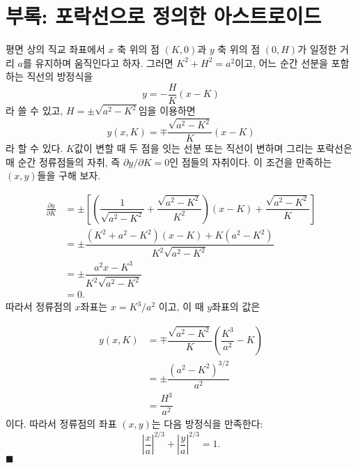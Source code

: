 \documentclass[twocolumn]{article}
\begin{document}
\appendix
\section*{부록: 포락선으로 정의한 아스트로이드}
평면 상의 직교 좌표에서 $x$ 축 위의 점  $(K, 0)$과 $y$ 축 위의 점 $(0, H)$가 일정한 거리 $a$를 유지하며 움직인다고 하자. 그러면 $K^2+H^2=a^2$이고, 어느 순간 선분을 포함하는 직선의 방정식을 
$$y=-\dfrac{H}{K}(x-K)$$
라 쓸 수 있고, $H=\pm \sqrt{a^2-K^2}$임을 이용하면 
$$y(x, K) = \mp \dfrac{\sqrt{a^2-K^2}}{K}(x-K)$$
라 할 수 있다. 
$K$값이 변할 때 두 점을 잇는 선분 또는 직선이 변하며 그리는 포락선은 매 순간 정류점들의 자취, 즉
\newcommand{\pardiff}[2]{{\frac{\partial #1}{\partial #2}}}
\newcommand{\ilpardiff}[2]{{{\partial #1}/{\partial #2}}}
$\ilpardiff{y}{K} = 0$인 점들의 자취이다. 이 조건을 만족하는 $(x, y)$들을 구해 보자.

$$ \begin{aligned}
\pardiff{y}{K} &= \pm\left[\left( \dfrac{1}{\sqrt{a^2-K^2}}+\dfrac{\sqrt{a^2-K^2}}{K^2}\right) (x-K) + \dfrac{\sqrt{a^2-K^2}}{K} \right]\\
	&= \pm \dfrac{(K^2+a^2-K^2)(x-K)+K(a^2-K^2)}{K^2\sqrt{a^2-K^2}}\\
	&= \pm \dfrac{a^2 x - K^3}{K^2 \sqrt{a^2 - K^2}}\\
	&= 0.
\end{aligned}
$$
따라서 정류점의 $x$좌표는 $x = K^3/a^2$ 이고, 이 때 $y$좌표의 값은

$$ \begin{aligned}
y(x, K) &= \mp \dfrac{\sqrt{a^2-K^2}}{K}\left(\dfrac{K^3}{a^2}-K\right)\\
	& = \pm \dfrac{\left( a^2- K^2 \right)^{3/2}}{a^2}\\
	& = \dfrac{H^3}{a^2}
\end{aligned}
$$
이다. 따라서 정류점의 좌표 $(x, y)$는 다음 방정식을 만족한다:
$$ \left|\dfrac{x}{a}\right|^{2/3} + \left|\dfrac{y}{a}\right|^{2/3} = 1. $$
$\blacksquare$
\end{document}
